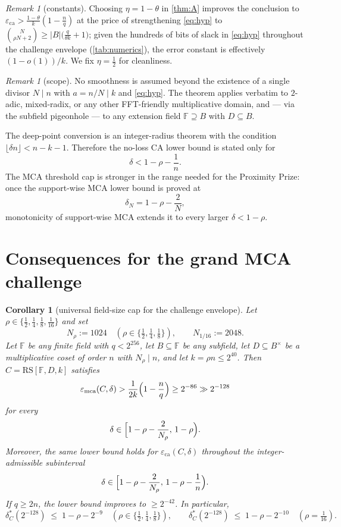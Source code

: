 \documentclass[11pt]{article}
\newtheorem{corollary}[theorem]{Corollary}
\theoremstyle{definition}
\theoremstyle{remark}
\newtheorem{remark}[theorem]{Remark}
\newcommand{\F}{\mathbb{F}}
\newcommand{\B}{B}
\newcommand{\RS}{\mathrm{RS}}
\newcommand{\eca}{\varepsilon_{\mathrm{ca}}}
\newcommand{\emca}{\varepsilon_{\mathrm{mca}}}
\begin{document}
\begin{remark}[constants]\label{rem:eta}
Choosing $\eta=1-\theta$ in \cref{thm:A} improves the conclusion to $\eca>\frac{1-\theta}k(1-\frac nq)$ at the price of strengthening \eqref{eq:hyp} to $\binom N{\rho N+2}\ge|\B|\bigl(\frac q{\theta k}+1\bigr)$; given the hundreds of bits of slack in \eqref{eq:hyp} throughout the challenge envelope (\cref{tab:numerics}), the error constant is effectively $(1-o(1))/k$. We fix $\eta=\frac12$ for cleanliness.
\end{remark}

\begin{remark}[scope]\label{rem:scope}
No smoothness is assumed beyond the existence of a single divisor $N\mid n$ with $a=n/N\mid k$ and \eqref{eq:hyp}. The theorem applies verbatim to $2$-adic, mixed-radix, or any other FFT-friendly multiplicative domain, and --- via the subfield pigeonhole --- to any extension field $\F\supseteq\B$ with $D\subseteq\B$.

The deep-point conversion is an integer-radius theorem with the condition $\lfloor\delta n\rfloor<n-k-1$. Therefore the no-loss CA lower bound is stated only for
\[
        \delta < 1-\rho-\frac1n .
\]
The MCA threshold cap is stronger in the range needed for the Proximity Prize: once the support-wise MCA lower bound is proved at
\[
        \delta_N=1-\rho-\frac2N,
\]
monotonicity of support-wise MCA extends it to every larger $\delta<1-\rho$.
\end{remark}

\section{Consequences for the grand MCA challenge}\label{sec:grand}

\begin{corollary}[universal field-size cap for the challenge envelope]\label{cor:grand}
Let $\rho\in\{\frac12,\frac14,\frac18,\frac1{16}\}$ and set
\[
N_\rho:=1024\quad(\rho\in\{\tfrac12,\tfrac14,\tfrac18\}),\qquad N_{1/16}:=2048 .
\]
Let $\F$ be any finite field with $q<2^{256}$, let $\B\subseteq\F$ be any subfield, let $D\subseteq\B^\times$ be a multiplicative coset of order $n$ with $N_\rho\mid n$, and let $k=\rho n\le2^{40}$. Then $C=\RS[\F,D,k]$ satisfies
\[
\emca(C,\delta)
>
\frac1{2k}\Bigl(1-\frac nq\Bigr)
\ge
2^{-86}
\gg
2^{-128}
\]
for every
\[
        \delta\in
        \Bigl[1-\rho-\frac2{N_\rho},\,1-\rho\Bigr).
\]
Moreover, the same lower bound holds for $\eca(C,\delta)$ throughout the integer-admissible subinterval
\[
        \delta\in
        \Bigl[1-\rho-\frac2{N_\rho},\,1-\rho-\frac1n\Bigr).
\]
If $q\ge2n$, the lower bound improves to $\ge2^{-42}$. In particular,
\[
\delta^*_C(2^{-128})\;\le\;1-\rho-2^{-9}\quad(\rho\in\{\tfrac12,\tfrac14,\tfrac18\}),
\qquad
\delta^*_C(2^{-128})\;\le\;1-\rho-2^{-10}\quad(\rho=\tfrac1{16}).
\]
\end{corollary}
\end{document}

